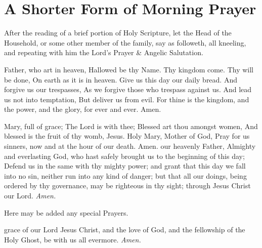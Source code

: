 \section*{A Shorter Form of Morning Prayer}
\begin{secrubric}
    After the reading of a brief portion of Holy Scripture, let the Head of the Household, or some other member of the family, say as followeth, all kneeling, and repeating with him the Lord's Prayer \& Angelic Salutation.
\end{secrubric}
 Father, who art in heaven, Hallowed be thy Name. Thy kingdom come. Thy will be done, On earth as it is in heaven. Give us this day our daily bread. And forgive us our trespasses, As we forgive those who trespass against us. And lead us not into temptation, But deliver us from evil. For thine is the kingdom, and the power, and the glory, for ever and ever. Amen.\par
{}
 Mary, full of grace; The Lord is with thee; Blessed art thou amongst women, And blessed is the fruit of thy womb, Jesus. Holy Mary, Mother of God, Pray for us sinners, now and at the hour of our death. Amen.
 our heavenly Father, Almighty and everlasting God, who hast safely brought us to the beginning of this day; Defend us in the same with thy mighty power; and grant that this day we fall into no sin, neither run into any kind of danger; but that all our doings, being ordered by thy governance, may be righteous in thy sight; through Jesus Christ our Lord. \textit{Amen.}
\begin{rubric}
    Here may be added any special Prayers.
\end{rubric}
 grace of our Lord Jesus Christ, {} and the love of God, and the fellowship of the Holy Ghost, be with us all evermore. \textit{Amen.}
 

